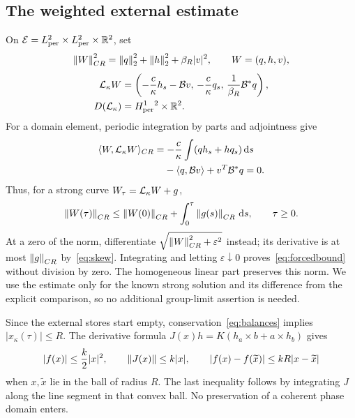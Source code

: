 \subsection{The weighted external estimate}\label{sec:forced}
On $\mathcal E=L^2_{\rm per}\times L^2_{\rm per}\times\mathbb R^2$, set
\begin{equation}\label{eq:externalnorm}
\left\|W\right\|_{CR}^2=\left\|q\right\|_2^2+\left\|h\right\|_2^2+\beta_R|v|^2,
\qquad W=(q,h,v),
\end{equation}
\begin{equation}\label{eq:operator}
\begin{aligned}
\mathcal L_\kappa W&=
\left(-\frac c\kappa h_s-\mathcal B v,\,
      -\frac c\kappa q_s,\,
      \frac1{\beta_R}\mathcal B^*q\right),\\
D(\mathcal L_\kappa)&=H^1_{\rm per}{}^2\times\mathbb R^2.
\end{aligned}
\end{equation}
For a domain element, periodic integration by parts and adjointness give
\begin{equation}\label{eq:skew}
\begin{aligned}
\langle W,\LL_\kappa W\rangle_{CR}
&=-\frac c\kappa\int(qh_s+hq_s)\dd s\\
&\phantom{={}}-\langle q,\B v\rangle+v^T\B^*q=0.
\end{aligned}
\end{equation}
Thus, for a strong curve $W_\tau=\mathcal L_\kappa W+g$,
\begin{equation}\label{eq:forcedbound}
\left\|W(\tau)\right\|_{CR}\le\left\|W(0)\right\|_{CR}
+\int_0^\tau\left\|g(s)\right\|_{CR}\,\mathrm d s,\qquad \tau\ge0.
\end{equation}
At a zero of the norm, differentiate
$\sqrt{\left\|W\right\|_{CR}^2+\varepsilon^2}$ instead; its derivative is at most $\left\|g\right\|_{CR}$ by~\eqref{eq:skew}. Integrating and letting $\varepsilon\downarrow0$ proves~\eqref{eq:forcedbound} without division by zero. The homogeneous linear part preserves this norm. We use the estimate only for the known strong solution and its difference from the explicit comparison, so no additional group-limit assertion is needed.

Since the external stores start empty, conservation~\eqref{eq:balances} implies $|x_\kappa(\tau)|\le R$. The derivative formula
$J(x)h=K(h_a\times b+a\times h_b)$ gives
\begin{equation}\label{eq:ballbounds}
|f(x)|\le\frac k2|x|^2,\qquad
\left\|J(x)\right\|\le k|x|,\qquad
|f(x)-f(\widetilde x)|\le kR|x-\widetilde x|
\end{equation}
when $x,\widetilde x$ lie in the ball of radius $R$. The last inequality follows by integrating $J$ along the line segment in that convex ball. No preservation of a coherent phase domain enters.

